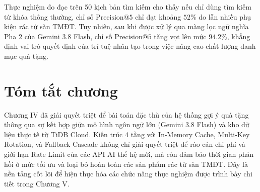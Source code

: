 Thực nghiệm đo đạc trên 50 kịch bản tìm kiếm cho thấy nếu chỉ dùng tìm kiếm từ khóa thông thường, chỉ số $\text{Precision}@5$ chỉ đạt khoảng $52\%$ do lẫn nhiều phụ kiện rác từ sàn TMĐT. Tuy nhiên, sau khi được xử lý qua màng lọc ngữ nghĩa Pha 2 của Gemini 3.8 Flash, chỉ số $\text{Precision}@5$ tăng vọt lên mức $\mathbf{94.2\%}$, khẳng định vai trò quyết định của trí tuệ nhân tạo trong việc nâng cao chất lượng danh mục quà tặng.

\section{Tóm tắt chương}
Chương IV đã giải quyết triệt để bài toán đặc thù của hệ thống gợi ý quà tặng thông qua sự kết hợp giữa mô hình ngôn ngữ lớn (Gemini 3.8 Flash) và kho dữ liệu thực tế từ TiDB Cloud. Kiến trúc 4 tầng với In-Memory Cache, Multi-Key Rotation, và Fallback Cascade không chỉ giải quyết triệt để rào cản chi phí và giới hạn Rate Limit của các API AI thế hệ mới, mà còn đảm bảo thời gian phản hồi ở mức tối ưu và loại bỏ hoàn toàn các sản phẩm rác từ sàn TMĐT. Đây là nền tảng cốt lõi để hiện thực hóa các chức năng thực nghiệm được trình bày chi tiết trong Chương V.